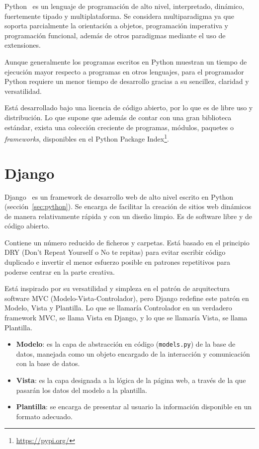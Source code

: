 \documentclass[a4paper, 12pt]{book}
\begin{document}
Python~\cite{python} es un lenguaje de programación de alto nivel, interpretado, dinámico, fuertemente tipado y multiplataforma.
Se considera multiparadigma ya que soporta parcialmente la orientación a objetos, programación imperativa y programación funcional, además de otros paradigmas mediante el uso de extensiones.

\vspace{5mm}
Aunque generalmente los programas escritos en Python muestran un tiempo de ejecución mayor respecto a programas en otros lenguajes, para el programador Python requiere un menor tiempo de desarrollo gracias a su sencillez, claridad y versatilidad.

\vspace{5mm}
Está desarrollado bajo una licencia de código abierto, por lo que es de libre uso y distribución.
Lo que supone que además de contar con una gran biblioteca estándar, exista una colección creciente de programas, módulos, paquetes o \emph{frameworks}, disponibles en el Python Package Index\footnote{\url{https://pypi.org/}}.


\section{Django}
\label{sec:django}

Django~\cite{django} es un framework de desarrollo web de alto nivel escrito en Python (sección~\ref{sec:python}).
Se encarga de facilitar la creación de sitios web dinámicos de manera relativamente rápida y con un diseño limpio.
Es de software libre y de código abierto.

\vspace{5mm}
Contiene un número reducido de ficheros y carpetas.
Está basado en el principio DRY (Don't Repeat Yourself o No te repitas) para evitar escribir código duplicado e invertir el menor esfuerzo posible en patrones repetitivos para poderse centrar en la parte creativa.

\vspace{5mm} %
Está inspirado por su versatilidad y simpleza en el patrón de arquitectura software MVC (Modelo-Vista-Controlador), pero Django redefine este patrón en Modelo, Vista y Plantilla.
Lo que se llamaría Controlador en un verdadero framework MVC, se llama Vista en Django, y lo que se llamaría Vista, se llama Plantilla.

\begin{itemize}
    \item \textbf{Modelo}: es la capa de abstracción en código (\texttt{models.py}) de la base de datos, manejada como un objeto encargado de la interacción y comunicación con la base de datos.
    \item \textbf{Vista}: es la capa designada a la lógica de la página web, a través de la que pasarán los datos del modelo a la plantilla.
    \item \textbf{Plantilla}: se encarga de presentar al usuario la información disponible en un formato adecuado. 
\end{itemize}
\end{document}
